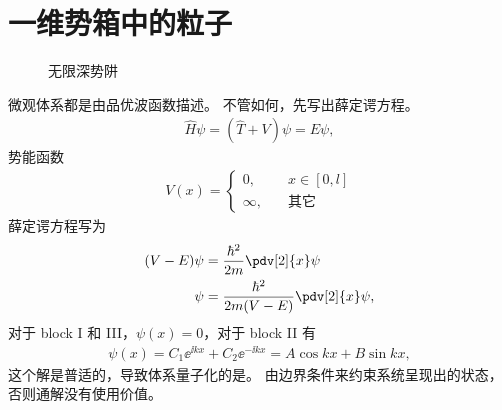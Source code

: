 \section{一维势箱中的粒子}
\begin{figure}[tp]\centering
    \caption{无限深势阱}
    \label{fig:inf_well}
\end{figure}
微观体系都是由品优波函数描述。
不管如何，先写出薛定谔方程。
\begin{eqnarray}
    \hat H \psi = (\hat T + V) \psi = E \psi,
\end{eqnarray}
势能函数
\begin{eqnarray}
    V(x) =
    \begin{cases}
        0, \quad &x\in [0,l]\\
        \infty, \quad &\text{其它}
    \end{cases}
\end{eqnarray}
薛定谔方程写为
\begin{align}
    (V-E) \psi &= \frac{\hbar^2}{2m} \pdv[2]{x} \psi \\
    \psi &= \frac{\hbar^2}{2m(V-E)} \pdv[2]{x} \psi,
\end{align}
对于 block I 和 III，$\psi(x) = 0$，对于 block II 有 
\begin{eqnarray}
    \psi(x) = C_1 \ee^{\ii k x} + C_2 \ee^{-\ii k x} = A \cos kx + B \sin kx,
\end{eqnarray}
这个解是普适的，导致体系量子化的是。
由边界条件来约束系统呈现出的状态，否则通解没有使用价值。

